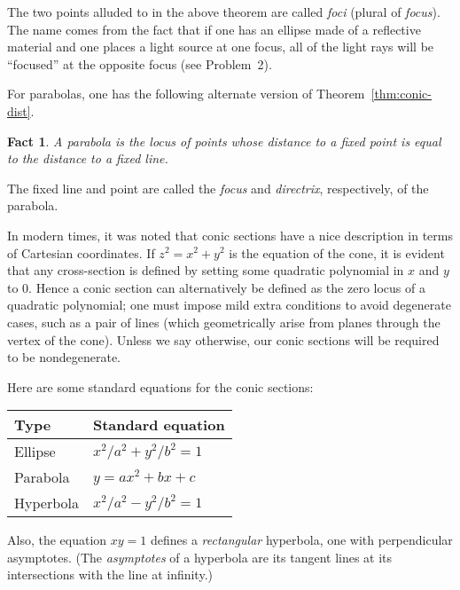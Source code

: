 \documentclass[12pt]{book}
\numberwithin{exc}{section}
\numberwithin{figure}{section}
\newtheorem{fact}[theorem]{Fact}
\numberwithin{equation}{theorem}
\begin{document}
The two points alluded to in the above theorem are called \emph{foci} 
(plural of \emph{focus}). 
The name comes from the fact
that if one has an ellipse made of a reflective 
material and one places a light source at one focus, all of the light 
rays will be ``focused'' at the opposite focus (see Problem~2).

For parabolas, one has the following alternate version of
Theorem~\ref{thm:conic-dist}.
\begin{fact}
A parabola is the locus of points whose distance to a fixed point is
equal to the distance to a fixed line.
\end{fact}
The fixed line and point are called the \emph{focus} and
\emph{directrix},  respectively,
of the parabola.

In modern times, it was noted that conic sections have a nice 
description in terms of Cartesian coordinates. If $z^{2} = 
x^{2}+y^{2}$ is the equation of the cone, it is evident that any 
cross-section is defined by setting some quadratic polynomial in $x$ 
and $y$ to 0. Hence a conic section can alternatively be defined as the zero locus of a 
quadratic polynomial; one must impose mild extra conditions to avoid 
degenerate cases, such as a pair of lines (which geometrically arise 
from planes through the vertex of the cone). Unless we say otherwise, 
our conic sections will be required to be nondegenerate.

Here are some standard equations for the conic sections:
\begin{center}
\begin{tabular}{l|l}
Type & Standard equation \\
\hline
Ellipse & $x^2/a^2 + y^2/b^2 = 1$ \\
Parabola & $y=ax^2+bx+c$ \\
Hyperbola & $x^2/a^2 - y^2/b^2=1$ 
\end{tabular}
\end{center}
Also, the equation $xy=1$ defines a \emph{rectangular} hyperbola,
 
one with perpendicular asymptotes. (The \emph{asymptotes} of a hyperbola
are its tangent lines at its intersections with the line at infinity.)
\end{document}
